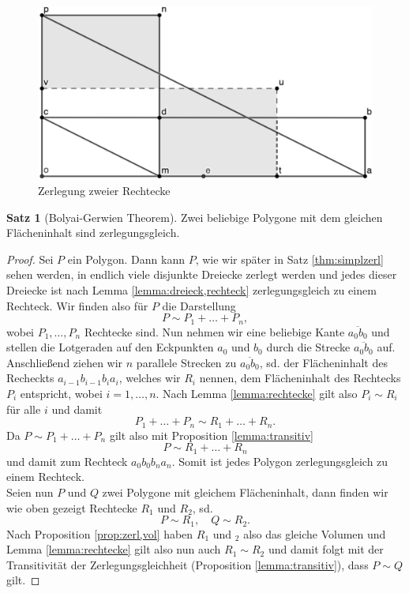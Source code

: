 \documentclass[11pt,titlepage]{article}
\theoremstyle{definition}
\newtheorem{theorem}{Satz}[section]
\theoremstyle{remark}
\begin{document}
	\begin{figure}[!htbp]
		\centering
		\includegraphics[scale=0.8]{Rechteck2}
		\caption{Zerlegung zweier Rechtecke}
		\label{Abb.3}
	\end{figure}
	
	\begin{theorem}[Bolyai-Gerwien Theorem] \label{theorem:bolyai-gerwien}
		Zwei beliebige Polygone mit dem gleichen Flächeninhalt sind zerlegungsgleich.
	\end{theorem}
	
	\begin{proof}
		Sei $P$ ein Polygon. Dann kann $P$, wie wir später in Satz \ref{thm:simplzerl} sehen werden, in endlich viele disjunkte Dreiecke zerlegt werden und jedes dieser 
		Dreiecke ist nach Lemma \ref{lemma:dreieck,rechteck} zerlegungsgleich zu einem Rechteck. Wir finden 
		also für $P$ die Darstellung
		\[ P\sim P_1+\ldots+P_n,\]
		wobei $P_1,\ldots,P_n$ Rechtecke sind. Nun nehmen wir eine beliebige Kante $\overline{a_0b_0}$ und 
		stellen die Lotgeraden auf den Eckpunkten $a_0$ und $b_0$ durch die Strecke $\overline{a_0b_0}$ 
		auf. Anschließend ziehen wir $n$ 
		parallele Strecken zu $\overline{a_0b_0}$, sd. der Flächeninhalt des Recheckts $a_{i-1}b_{i-1}b_ia_i$, 
		welches wir $R_i$ nennen, dem Flächeninhalt des Rechtecks $P_i$ entspricht, wobei $i=1,\ldots,n$. 
		Nach Lemma \ref{lemma:rechtecke} gilt also $P_i\sim R_i$ für alle $i$ und damit
		\[ P_1+\ldots+P_n\sim R_1+\ldots+R_n. \]
		Da $P\sim P_1+\ldots+P_n$ gilt also mit Proposition \ref{lemma:transitiv}
		\[ P\sim R_1+\ldots+R_n\]
		und damit zum Rechteck $a_0b_0b_na_n$. Somit ist jedes Polygon zerlegungsgleich zu einem Rechteck. \\
		Seien nun $P$ und $Q$ zwei Polygone mit gleichem Flächeninhalt, dann finden wir wie oben gezeigt 
		Rechtecke $R_1$ und $R_2$, sd.
		\[ P\sim R_1,\quad Q\sim R_2.\]
		Nach Proposition \ref{prop:zerl,vol} haben $R_1$ und $_2$ also das 
		gleiche Volumen und Lemma \ref{lemma:rechtecke} gilt also nun auch 
		$R_1\sim R_2$ und damit folgt mit der Transitivität 
		der Zerlegungsgleichheit 
		(Proposition \ref{lemma:transitiv}), dass $P\sim Q$ gilt.
	\end{proof}
	
\end{document}
